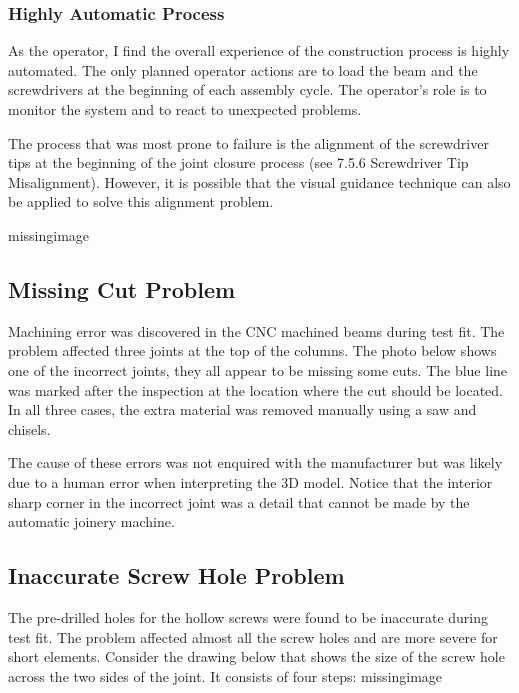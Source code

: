 \subsubsection{Highly Automatic Process}
\label{subsubsection:exploration_4_highly_automatic_process}

As the operator, I find the overall experience of the construction process is highly automated. The only planned operator actions are to load the beam and the screwdrivers at the beginning of each assembly cycle. The operator’s role is to monitor the system and to react to unexpected problems.

The process that was most prone to failure is the alignment of the screwdriver tips at the beginning of the joint closure process (see 7.5.6 Screwdriver Tip Misalignment). However, it is possible that the visual guidance technique can also be applied to solve this alignment problem. 

missingimage

\subsection{Missing Cut Problem}
\label{subsection:exploration_4_missing_cut_problem}

Machining error was discovered in the CNC machined beams during test fit. The problem affected three joints at the top of the columns. The photo below shows one of the incorrect joints, they all appear to be missing some cuts. The blue line was marked after the inspection at the location where the cut should be located. In all three cases, the extra material was removed manually using a saw and chisels. 

The cause of these errors was not enquired with the manufacturer but was likely due to a human error when interpreting the 3D model. Notice that the interior sharp corner in the incorrect joint was a detail that cannot be made by the automatic joinery machine. 

\subsection{Inaccurate Screw Hole Problem}
\label{subsection:exploration_4_inaccurate_screw_hole_problem}

The pre-drilled holes for the hollow screws were found to be inaccurate during test fit. The problem affected almost all the screw holes and are more severe for short elements.
Consider the drawing below that shows the size of the screw hole across the two sides of the joint. It consists of four steps:
missingimage

